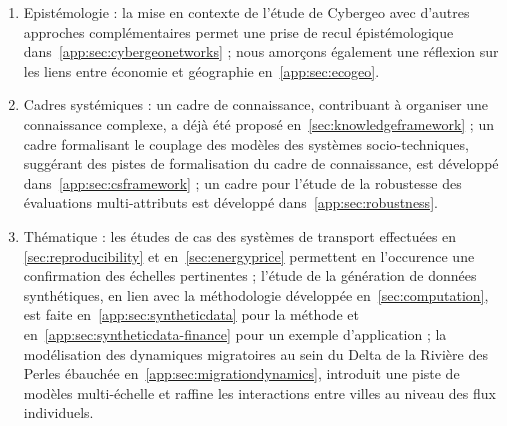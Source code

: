 {\begin{enumerate}
	\item Epistémologie : la mise en contexte de l'étude de Cybergeo avec d'autres approches complémentaires permet une prise de recul épistémologique dans~\ref{app:sec:cybergeonetworks} ; nous amorçons également une réflexion sur les liens entre économie et géographie en~\ref{app:sec:ecogeo}.
	\item Cadres systémiques : un cadre de connaissance, contribuant à organiser une connaissance complexe, a déjà été proposé en~\ref{sec:knowledgeframework} ; un cadre formalisant le couplage des modèles des systèmes socio-techniques, suggérant des pistes de formalisation du cadre de connaissance, est développé dans~\ref{app:sec:csframework} ; un cadre pour l'étude de la robustesse des évaluations multi-attributs est développé dans~\ref{app:sec:robustness}.
	\item Thématique : les études de cas des systèmes de transport effectuées en \ref{sec:reproducibility} et en~\ref{sec:energyprice} permettent en l'occurence une confirmation des échelles pertinentes ; l'étude de la génération de données synthétiques, en lien avec la méthodologie développée en~\ref{sec:computation}, est faite en~\ref{app:sec:syntheticdata} pour la méthode et en~\ref{app:sec:syntheticdata-finance} pour un exemple d'application ; la modélisation des dynamiques migratoires au sein du Delta de la Rivière des Perles ébauchée en~\ref{app:sec:migrationdynamics}, introduit une piste de modèles multi-échelle et raffine les interactions entre villes au niveau des flux individuels.
\end{enumerate}
}


